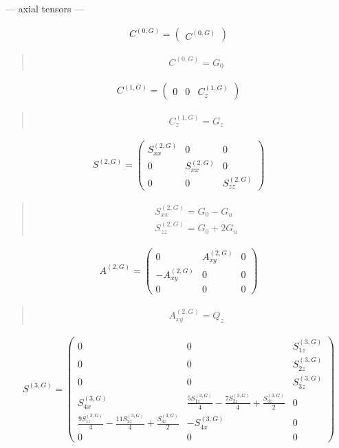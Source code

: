 \documentclass[fleqn,10pt]{jsarticle}
\begin{document}
\newpage
\begin{center}\LARGE --- axial tensors ---\end{center}
\begin{align*}
C^{(0,G)} = \begin{pmatrix} C^{(0,G)} \end{pmatrix}
\end{align*}
\begin{quote}
\begin{align*}
& C^{(0,G)} = G_{0}
\end{align*}
\end{quote}
\begin{align*}
C^{(1,G)} = \begin{pmatrix} 0 & 0 & C^{(1,G)}_{z} \end{pmatrix}
\end{align*}
\begin{quote}
\begin{align*}
& C^{(1,G)}_{z} = G_{z}
\end{align*}
\end{quote}
\begin{align*}
S^{(2,G)} = \begin{pmatrix} S^{(2,G)}_{xx} & 0 & 0 \\ 0 & S^{(2,G)}_{xx} & 0 \\ 0 & 0 & S^{(2,G)}_{zz} \end{pmatrix}
\end{align*}
\begin{quote}
\begin{align*}
& S^{(2,G)}_{xx} = G_{0} - G_{u} \\
& S^{(2,G)}_{zz} = G_{0} + 2 G_{u}
\end{align*}
\end{quote}
\begin{align*}
A^{(2,G)} = \begin{pmatrix} 0 & A^{(2,G)}_{xy} & 0 \\ - A^{(2,G)}_{xy} & 0 & 0 \\ 0 & 0 & 0 \end{pmatrix}
\end{align*}
\begin{quote}
\begin{align*}
& A^{(2,G)}_{xy} = Q_{z}
\end{align*}
\end{quote}
\begin{align*}
S^{(3,G)} = \begin{pmatrix} 0 & 0 & S^{(3,G)}_{1z} \\ 0 & 0 & S^{(3,G)}_{2z} \\ 0 & 0 & S^{(3,G)}_{3z} \\ S^{(3,G)}_{4x} & \frac{5 S^{(3,G)}_{1z}}{4} - \frac{7 S^{(3,G)}_{2z}}{4} + \frac{S^{(3,G)}_{3z}}{2} & 0 \\ \frac{9 S^{(3,G)}_{1z}}{4} - \frac{11 S^{(3,G)}_{2z}}{4} + \frac{S^{(3,G)}_{3z}}{2} & - S^{(3,G)}_{4x} & 0 \\ 0 & 0 & 0 \end{pmatrix}
\end{align*}
\end{document}
